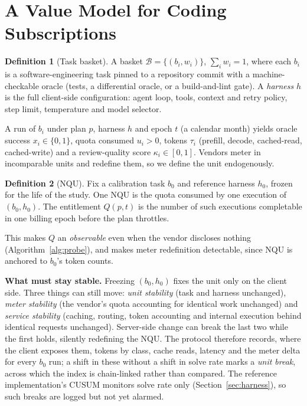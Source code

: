 \documentclass[conference]{IEEEtran}
\theoremstyle{plain}
\theoremstyle{definition}
\newtheorem{definition}{Definition}
\newcommand{\NQU}{\ensuremath{\mathrm{NQU}}}
\begin{document}
\section{A Value Model for Coding Subscriptions}
\label{sec:model}

\begin{definition}[Task basket]
A basket $\mathcal{B}=\{(b_i,w_i)\}$, $\sum_i w_i = 1$, where each $b_i$ is a
software-engineering task pinned to a repository commit with a
machine-checkable oracle (tests, a differential oracle, or a build-and-lint
gate). A \emph{harness} $h$ is the full client-side configuration: agent loop,
tools, context and retry policy, step limit, temperature and model selector.
\end{definition}

A run of $b_i$ under plan $p$, harness $h$ and epoch $t$ (a calendar month)
yields oracle success $x_i\in\{0,1\}$, quota consumed $u_i>0$, tokens
$\tau_i$ (prefill, decode, cached-read, cached-write) and a review-quality
score $\kappa_i\in[0,1]$. Vendors meter in incomparable units and redefine
them, so we define the unit endogenously.

\begin{definition}[\NQU]
Fix a calibration task $b_0$ and reference harness $h_0$, frozen for the life
of the study. One \NQU{} is the quota consumed by one execution of
$(b_0,h_0)$. The entitlement $Q(p,t)$ is the number of such executions
completable in one billing epoch before the plan throttles.
\end{definition}

This makes $Q$ an \emph{observable} even when the vendor discloses nothing
(Algorithm~\ref{alg:probe}), and makes meter redefinition detectable, since
\NQU{} is anchored to $b_0$'s token counts.

\textbf{What must stay stable.} Freezing $(b_0,h_0)$ fixes the unit only on the
client side. Three things can still move: \emph{unit stability} (task and
harness unchanged), \emph{meter stability} (the vendor's quota accounting for
identical work unchanged) and \emph{service stability} (caching, routing, token
accounting and internal execution behind identical requests unchanged).
Server-side change can break the last two while the first holds, silently
redefining the \NQU. The protocol therefore records, where the client exposes
them, tokens by class, cache reads, latency and the meter delta for every $b_0$
run; a shift in these without a shift in solve rate marks a \emph{unit break},
across which the index is chain-linked rather than compared. The reference
implementation's CUSUM monitors solve rate only (Section~\ref{sec:harness}), so
such breaks are logged but not yet alarmed.
\end{document}
